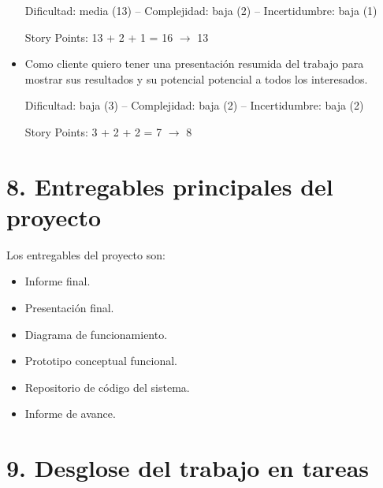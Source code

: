 \documentclass[
11pt, %
]{charter}
\begin{document}
\begin{itemize}
Dificultad: media (13) -- Complejidad: baja (2) -- Incertidumbre: baja (1)

Story Points: 13 + 2 + 1 = 16 $\rightarrow$ 13

\item Como cliente quiero tener una presentación resumida del trabajo para mostrar sus resultados y su potencial potencial a todos los interesados.

Dificultad: baja (3) -- Complejidad: baja (2) -- Incertidumbre: baja (2)

Story Points: 3 + 2 + 2 = 7 $\rightarrow$ 8


\end{itemize}

\section{8. Entregables principales del proyecto}
\label{sec:entregables}

Los entregables del proyecto son:

\begin{itemize}
 \item Informe final.
 \item Presentación final.
 \item Diagrama de funcionamiento.
 \item Prototipo conceptual funcional.
 \item Repositorio de código del sistema.
 \item Informe de avance.
\end{itemize}

\section{9. Desglose del trabajo en tareas}
\label{sec:wbs}
\end{document}
